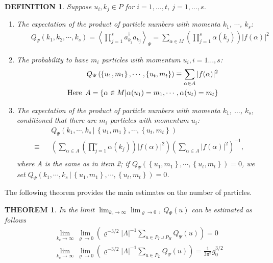 \documentclass[11pt]{article}
\numberwithin{equation}{section}
\newcommand{\beqa}{\begin{eqnarray}}
\newcommand{\eeqa}{\end{eqnarray}}
\newcommand\Z{{\mathbb Z}}
\newcommand\al{{\alpha}}
\newcommand\umt{\left\{u_1, m_1\right\},\cdots,\left\{u_t,m_t\right\}}
\renewcommand\rho\varrho
\newtheorem{thm}{THEOREM}[section]
\newtheorem{mydef}{DEFINITION}[section]
\theoremstyle{definition}
\begin{document}
\begin{mydef}\label{1}
Suppose $u_i, k_j \in P$ for $i = 1, \ldots, t$, $j = 1, \ldots, s$.
\begin{enumerate}
	\item  The expectation of the  product of  particle numbers with momenta  $k_1$, $\cdots$, $k_s$:
	\beqa\nonumber
&&Q_\Psi  \left(k_1,k_2,\cdots,k_s\right)
=\left\langle\prod_{j=1}^sa^\dagger_{k_j} a_{k_j}\right\rangle_{\Psi}
=\sum_{\al\in M} \left(\prod_{j=1}^s{\al(k_j)}\right)|f(\al)|^2
\eeqa

\item The probability to have $m_i$ particles with momentum 
	$u_i, i= 1 \ldots, s$: 
\beqa\label{2.1}
&& Q_\Psi\left(\umt\right)
\equiv\sum_{\al\in A} |f(\al)|^2\\\nonumber
 &&{\rm Here}\,\,\,A=\left\{\al\in M| \al(u_1)=m_1,\cdots,\al(u_t)=m_t\right\}
\eeqa
\item The expectation of the  product of  particle numbers with momenta  $k_1$, $\ldots$, $k_s$,
conditioned that there are  $m_i$ particles with momentum $u_i$:
\beqa\nonumber
&&Q_\Psi\left(k_1,\cdots,k_s \, | \, \umt\right)\\\nonumber
\equiv&&\left(\sum_{\al\in A} \left(\prod_{j=1}^s{\al(k_j)}\right)|f(\al)|^2\right)
\left(\sum_{\al\in A} |f(\al)|^2\right)^{-1}, \\\nonumber
\eeqa
where $A$ is the same as in item 2; if $Q_\Psi\left(\umt\right)=0$, we set $Q_\Psi\left(k_1,\cdots,k_s \, | \, \umt\right)=0$.
\end{enumerate}
\end{mydef}





The following theorem provides the main estimates on the number of particles. 


\begin{thm}\label{thmA} 
In the limit $\lim_{k_c \to\infty}\lim_{\rho\to0}$, $  Q_\Psi(u)$  can be estimated as follows
\beqa\label{boundspsiuPMPHtotal}
&&\lim_{k_c \to\infty}\lim_{\rho\to0} \left(\rho^{-3/2}|\Lambda|^{-1}\sum_{u\in P_I\cup P_H} Q_\Psi(u)\right)=0\\
\label{boundspsiuPLtotal}
&&\lim_{k_c \to\infty}\lim_{\rho\to0}\left(\rho^{-3/2}|\Lambda|^{-1}\sum_{u\in P_L} Q_\Psi(u)\right)=\frac1{3\pi^2}g^{3/2}_0
\eeqa
\end{thm}
\end{document}
